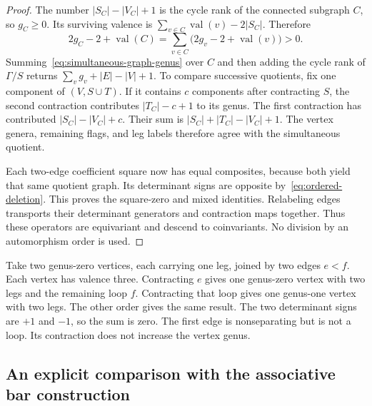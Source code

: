\begin{proof}
The number $|S_C|-|V_C|+1$ is the cycle rank of the connected subgraph $C$, so $g_C\geq0$.
Its surviving valence is $\sum_{v\in C}\operatorname{val}(v)-2|S_C|$.
Therefore
\[
2g_C-2+\operatorname{val}(C)
=\sum_{v\in C}\bigl(2g_v-2+\operatorname{val}(v)\bigr)>0.
\]
Summing~\eqref{eq:simultaneous-graph-genus} over $C$ and then adding the cycle rank of $\Gamma/S$
returns $\sum_vg_v+|E|-|V|+1$.
To compare successive quotients, fix one component of $(V,S\cup T)$.
If it contains $c$ components after contracting $S$, the second contraction contributes $|T_C|-c+1$ to its genus.
The first contraction has contributed $|S_C|-|V_C|+c$.
Their sum is $|S_C|+|T_C|-|V_C|+1$.
The vertex genera, remaining flags, and leg labels therefore agree with the simultaneous quotient.

Each two-edge coefficient square now has equal composites, because both yield that same quotient graph.
Its determinant signs are opposite by~\eqref{eq:ordered-deletion}.
This proves the square-zero and mixed identities.
Relabeling edges transports their determinant generators and contraction maps together.
Thus these operators are equivariant and descend to coinvariants.
No division by an automorphism order is used.
\end{proof}

\begin{example}
\label{ex:parallel-edges}
Take two genus-zero vertices, each carrying one leg, joined by two edges $e<f$.
Each vertex has valence three.
Contracting $e$ gives one genus-zero vertex with two legs and the remaining loop $f$.
Contracting that loop gives one genus-one vertex with two legs.
The other order gives the same result.
The two determinant signs are $+1$ and $-1$, so the sum is zero.
The first edge is nonseparating but is not a loop.
Its contraction does not increase the vertex genus.
\end{example}

\subsection{An explicit comparison with the associative bar construction}
\label{subsec:associative-comparison}

